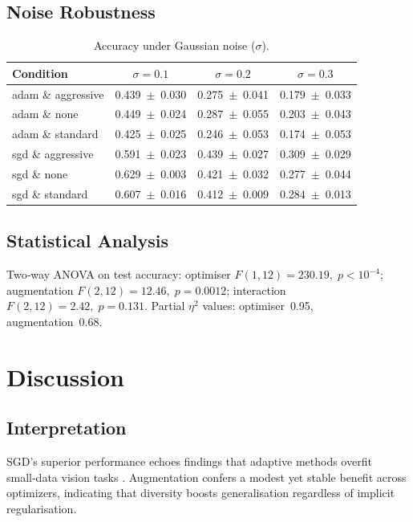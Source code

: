 \documentclass{article}
\begin{document}
\subsection{Noise Robustness}
\begin{table}[ht]
  \centering
  \caption{Accuracy under Gaussian noise ($\sigma$).}
  \label{tab:robust}
  \begin{tabular}{l c c c}
    \toprule
    Condition & $\sigma{=}0.1$ & $\sigma{=}0.2$ & $\sigma{=}0.3$\\
    \midrule
    adam \& aggressive & 0.439 $\pm$ 0.030 & 0.275 $\pm$ 0.041 & 0.179 $\pm$ 0.033\\
    adam \& none       & 0.449 $\pm$ 0.024 & 0.287 $\pm$ 0.055 & 0.203 $\pm$ 0.043\\
    adam \& standard   & 0.425 $\pm$ 0.025 & 0.246 $\pm$ 0.053 & 0.174 $\pm$ 0.053\\
    sgd  \& aggressive & 0.591 $\pm$ 0.023 & 0.439 $\pm$ 0.027 & 0.309 $\pm$ 0.029\\
    sgd  \& none       & 0.629 $\pm$ 0.003 & 0.421 $\pm$ 0.032 & 0.277 $\pm$ 0.044\\
    sgd  \& standard   & 0.607 $\pm$ 0.016 & 0.412 $\pm$ 0.009 & 0.284 $\pm$ 0.013\\
    \bottomrule
  \end{tabular}
\end{table}

\subsection{Statistical Analysis}
Two‑way ANOVA on test accuracy: optimiser $F(1,12)=230.19,\;p<10^{-4}$; augmentation $F(2,12)=12.46,\;p=0.0012$; interaction $F(2,12)=2.42,\;p=0.131$. Partial $\eta^2$ values: optimiser 0.95, augmentation 0.68.

\section{Discussion}

\subsection{Interpretation}
SGD’s superior performance echoes findings that adaptive methods overfit small‑data vision tasks \cite{wilson2017marginal}. Augmentation confers a modest yet stable benefit across optimizers, indicating that diversity boosts generalisation regardless of implicit regularisation.
\end{document}
